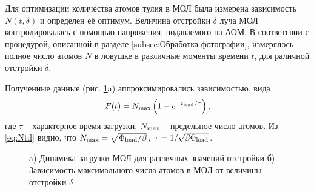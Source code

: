 


\startp
{}
Для оптимизации количества атомов тулия в МОЛ была измерена зависимость $N(t, \delta)$ и определен её оптимум. Величина отстройки $\delta$ луча МОЛ контролировалась с помощью напряжения, подаваемого на АОМ. В соответсвии с процедурой, описанной в разделе \ref{subsec:Обработка фотографии}, измерялось полное число атомов $N$ в ловушке в различные моменты времени $t$, для раличной отстройки $\delta$. 

Полученные данные (рис. \ref{fig:motload}a) аппроксимировались зависимостью, вида
\begin{equation}
	F(t) = N_{\textnormal{max}} \left(1- e^{-t_{\textnormal{load}}/\tau}\right),
\end{equation}
где $\tau$ -- характерное время загрузки, $N_{\textnormal{max}}$ -- предельное число атомов. Из \eqref{eq:Ntd} видно, что $N_{\textnormal{max}} = \sqrt{\Phi_{\textnormal{load}}/\beta}$, $\tau = 1/\sqrt{\beta \Phi_{\textnormal{load}}}$.

\begin{figure}[ht]
    \centering
    \hspace{10 mm} 
    \caption{a) Динамика загрузки МОЛ для различных значений отстройки б)  Зависимость максимального числа атомов в МОЛ от величины отстройки $\delta$}
    \label{fig:motload}
\end{figure}




